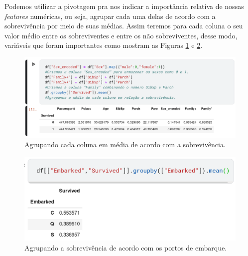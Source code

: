 \documentclass{article}
\begin{document}
Podemos utilizar a pivotagem pra nos indicar a importância relativa de nossas \emph{features} numéricas, ou seja, agrupar cada uma delas de acordo com a sobrevivência por meio de suas médias. Assim teremos para cada coluna o seu valor médio entre os sobreviventes e entre os não sobreviventes, desse modo, variáveis que foram importantes como mostram as Figuras \ref{df.groupby} e \ref{embarked.groupby}.

\begin{figure}[H]
\centering
\includegraphics[width=\textwidth]{Figures/df.groupby.png}
\caption{\label{df.groupby}Agrupando cada coluna em média de acordo com a sobrevivência.}
\end{figure}

\begin{figure}[H]
\centering
\includegraphics[width=\textwidth]{Figures/embarked.png}
\caption{\label{embarked.groupby}Agrupando a sobrevivência de acordo com os portos de embarque.}
\end{figure}
\end{document}

